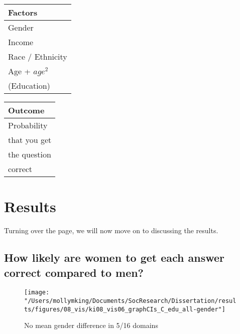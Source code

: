 \documentclass[]{article}
\begin{document}
\begin{table}[ht]
\centering
    \begin{tabular}{l}  %
      \hline   %
      Factors          \\
      \hline   %
      Gender           \\
      Income           \\
      Race / Ethnicity \\
      Age + $age^2$    \\
      (Education)        \\
      \hline  %
    \end{tabular}
    \begin{tabular}{l}  %
       \hline   %
       Outcome        \\
       \hline   %
       Probability      \\
       that you get     \\
       the question     \\
       correct          \\
       \hline  %
     \end{tabular}
\end{table}



\newpage
\section{Results}\label{Results}

Turning over the page, we will now move on to discussing the results.

\subsection{How likely are women to get each answer correct compared to men?}
\begin{figure}[ht]
    \begin{center}
      \texttt{[image: "/Users/mollymking/Documents/SocResearch/Dissertation/results/figures/08\_vis/ki08\_vis06\_graphCIs\_C\_edu\_all-gender"]}
      \caption{No mean gender difference in 5/16 domains}
    \end{center}
\end{figure}
\end{document}
